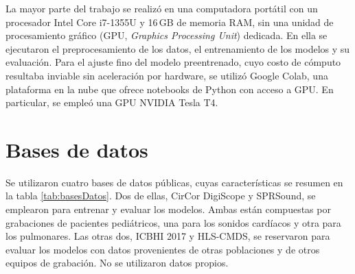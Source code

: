 
La mayor parte del trabajo se realizó en una computadora portátil con un procesador Intel Core
i7-1355U y 16\,GB de memoria RAM, sin una unidad de procesamiento gráfico (GPU, \textit{Graphics
Processing Unit}) dedicada. En ella se ejecutaron el preprocesamiento de los datos, el entrenamiento
de los modelos y su evaluación. Para el ajuste fino del modelo preentrenado, cuyo
costo de cómputo resultaba inviable sin aceleración por hardware, se utilizó Google Colab, una
plataforma en la nube que ofrece notebooks de Python con acceso a GPU. En particular, se empleó una
GPU NVIDIA Tesla T4.


\section{Bases de datos}
\label{sec:basesDatos}

Se utilizaron cuatro bases de datos públicas, cuyas características se resumen en la tabla
\ref{tab:basesDatos}. Dos de ellas, CirCor DigiScope y SPRSound, se emplearon para entrenar y
evaluar los modelos. Ambas están compuestas por grabaciones de pacientes pediátricos, una para los
sonidos cardíacos y otra para los pulmonares. Las otras dos, ICBHI 2017 y HLS-CMDS, se reservaron
para evaluar los modelos con datos provenientes de otras poblaciones y de otros equipos de
grabación. No se utilizaron datos propios.


